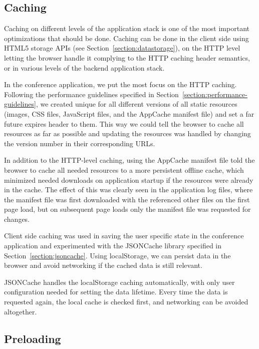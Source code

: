 \subsection{Caching}

Caching on different levels of the application stack is one of the
most important optimizations that should be done. Caching can be done
in the client side using HTML5 storage APIs (see
Section~\ref{section:datastorage}), on the HTTP level letting the
browser handle it complying to the HTTP caching header semantics, or
in various levels of the backend application stack.

In the conference application, we put the most focus on the HTTP
caching. Following the performance guidelines specified in
Section~\ref{section:performance-guidelines}, we created unique
 for all different versions of all static resources
(images, CSS files, JavaScript files, and the AppCache manifest file)
and set a far future expires header to them. This way we could tell
the browser to cache all resources as far as possible and updating the
resources was handled by changing the version number in their
corresponding URLs.

In addition to the HTTP-level caching, using the AppCache manifest
file told the browser to cache all needed resources to a more
persistent offline cache, which minimized needed downloads on
application startup if the resources were already in the cache. The
effect of this was clearly seen in the application log files, where
the manifest file was first downloaded with the referenced other files
on the first page load, but on subsequent page loads only the manifest
file was requested for changes.

Client side caching was used in saving the user specific state in the
conference application and experimented with the JSONCache library
specified in Section~\ref{section:jsoncache}. Using localStorage, we
can persist data in the browser and avoid networking if the cached
data is still relevant.

JSONCache handles the localStorage caching automatically, with only
user configuration needed for setting the data lifetime. Every time
the data is requested again, the local cache is checked first, and
networking can be avoided altogether.

\subsection{Preloading}

